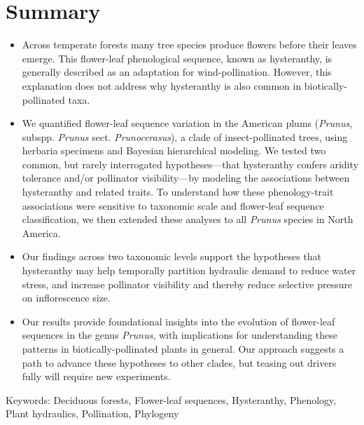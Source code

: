 \documentclass{article}[12pt]
\begin{document}
\section*{Summary} %
\begin{itemize}
\item Across temperate forests many tree species produce flowers before their leaves emerge. This flower-leaf phenological sequence, known as hysteranthy, is generally described as an adaptation for wind-pollination. However, this explanation does not address why hysteranthy is also common in biotically-pollinated taxa.

\item We quantified flower-leaf sequence variation in the American plums (\emph{Prunus}, subspp. \emph{Prunus} sect. \emph{Prunocerasus}), a clade of insect-pollinated trees, using herbaria specimens and Bayesian hierarchical modeling. We tested two common, but rarely interrogated hypotheses---that hysteranthy confers aridity tolerance and/or pollinator visibility---by modeling the associations between hysteranthy and related traits. To understand how these phenology-trait associations were sensitive to taxonomic scale and flower-leaf sequence classification, we then extended these analyses to all \emph{Prunus} species in North America. 

\item Our findings across two taxonomic levels support the hypotheses that hysteranthy may help temporally partition hydraulic demand to reduce water stress, and increase pollinator visibility and thereby reduce selective pressure on inflorescence size.


\item Our results provide foundational insights into the evolution of flower-leaf sequences in the genus \emph{Prunus}, with implications for understanding these patterns in biotically-pollinated plants in general. Our approach suggests a path to advance these hypotheses to other clades, but teasing out drivers fully will require new experiments.
\end{itemize}

Keywords: Deciduous forests, Flower-leaf sequences, Hysteranthy, Phenology, Plant hydraulics, Pollination, Phylogeny

\pagebreak
\end{document}
